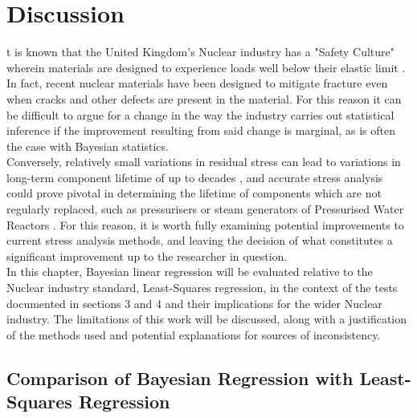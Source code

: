 %
%
\let\textcircled=\pgftextcircled
\chapter{Discussion}
\label{chap:intro}

t is known that the United Kingdom's Nuclear industry has a "Safety Culture" wherein materials are designed to experience loads well below their elastic limit \cite{internationalnuclearsafetyadvisorygroup_1991_safety}. In fact, recent nuclear materials have been designed to mitigate fracture even when cracks and other defects are present in the material. \cite{nichols_1981_fracture} For this reason it can be difficult to argue for a change in the way the industry carries out statistical inference if the improvement resulting from said change is marginal, as is often the case with Bayesian statistics. \cite{smidd_2020_bayesian}\\

Conversely, relatively small variations in residual stress can lead to variations in long-term component lifetime of up to decades \cite{webster_2001_residual}, and accurate stress analysis could prove pivotal in determining the lifetime of components which are not regularly replaced, such as pressurisers or steam generators of Pressurised Water Reactors \cite{internationalatomicenergyassociation_2008_heavy}. For this reason, it is worth fully examining potential improvements to current stress analysis methods, and leaving the decision of what constitutes a significant improvement up to the researcher in question.\\

In this chapter, Bayesian linear regression will be evaluated relative to the Nuclear industry standard, Least-Squares regression, in the context of the tests documented in sections 3 and 4 and their implications for the wider Nuclear industry. The limitations of this work will be discussed, along with a justification of the methods used and potential explanations for sources of inconsistency. 



\section{Comparison of Bayesian Regression with Least-Squares Regression}
\label{sec:sec01}

